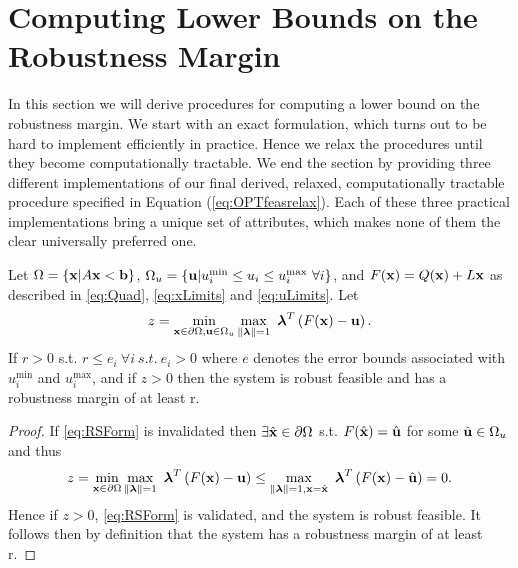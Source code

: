 \section{Computing Lower Bounds on the Robustness Margin} \label{sec:inbdform}  
In this section we will derive procedures for computing a lower bound on the robustness margin. 
We start with an exact formulation, which turns out to be hard to implement efficiently in practice.
Hence we relax the procedures until they become computationally tractable. 
We end the section by providing three different implementations of our final derived, relaxed, computationally tractable procedure specified in Equation (\ref{eq:OPTfeasrelax}).
Each of these three practical implementations bring a unique set of attributes, which makes none of them the clear universally preferred one.

\begin{thm}
Let $\Omega=\{\mathbf{x}| A\mathbf{x}< \mathbf{b}\}$, $\Omega_{u}=\{\mathbf{u}| u^{\min}_i\leq u_i \leq u^{\max}_i \ \forall i \}$, and $F(\mathbf{x})=Q(\mathbf{x})+L\mathbf{x}$ as described in \ref{eq:Quad}, \ref{eq:xLimits} and \ref{eq:uLimits}. 
Let
$$z = \min\limits_{\vx\in \partial \Omega, \vu\in \Omega_{u} }\max\limits_{\norm{\vlambda}=1}\ \vlambda^T\left(F(\vx)-\vu\right).$$
If $r>0$ s.t. $r\leq e_i \ \forall i \ s.t. \ e_i>0$ where $e$ denotes the error bounds associated with $ u^{\min}_i$ and $ u^{\max}_i$, and if $z>0$ then the system is robust feasible and has a robustness margin of at least r.

\begin{proof} 
If \cref{eq:RSForm} is invalidated then $\exists \hat{\mathbf{x}}\in\partial\Omega$ s.t. $F(\hat{\mathbf{x}})=\hat{\mathbf{u}}$ for some $\hat{\mathbf{u}}\in\Omega_{u}$ and thus $$z = \min\limits_{\vx\in \partial \Omega}\max\limits_{\norm{\vlambda}=1}\ \vlambda^T\left(F(\vx)-\vu\right)\leq \max\limits_{\norm{\vlambda}=1, \vx=\hat{\vx}}\ \vlambda^T\left(F(\vx)-\hat{\vu}\right)=0.$$ 
Hence if $z>0$, \cref{eq:RSForm} is validated, and the system is robust feasible. It follows then by definition that the system has a robustness margin of at least r.
\end{proof}
\end{thm}

